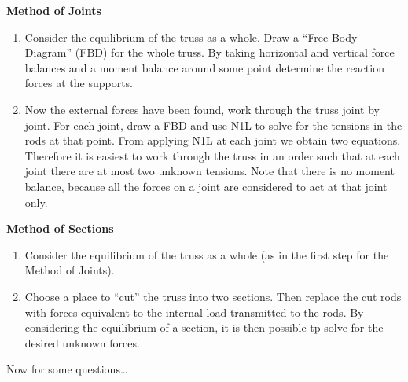 {\bf Method of Joints}
\begin{enumerate}
 \item Consider the equilibrium of the truss as a whole. Draw a ``Free Body Diagram'' (FBD) for the whole truss. By taking horizontal and vertical force balances and a moment balance around some point determine the reaction forces at the supports.
 \item Now the external forces have been found, work through the truss joint by joint. For each joint, draw a FBD and use N1L to solve for the tensions in the rods at that point. From applying N1L at each joint we obtain two equations. Therefore it is easiest to work through the truss in an order such that at each joint there are at most two unknown tensions. Note that there is no moment balance, because all the forces on a joint are considered to act at that joint only.
\end{enumerate}

{\bf Method of Sections}
\begin{enumerate}
 \item Consider the equilibrium of the truss as a whole (as in the first step for the Method of Joints).
 \item Choose a place to ``cut'' the truss into two sections. Then replace the cut rods with forces equivalent to the internal load transmitted to the rods. By considering the equilibrium of a section, it is then possible tp solve for the desired unknown forces.
\end{enumerate}

Now for some questions\dots